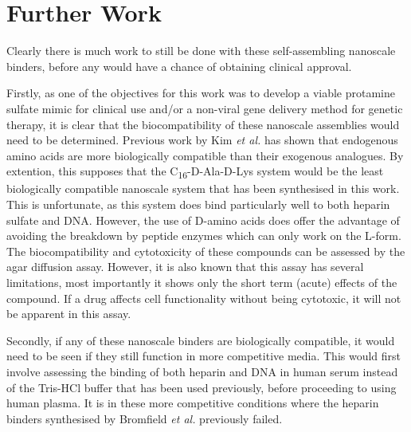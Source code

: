 
\chapter{Further Work} %
\label{Chapter4} %
Clearly there is much work to still be done with these self-assembling nanoscale binders, before any would have a chance of obtaining clinical approval.  

Firstly, as one of the objectives for this work was to develop a viable protamine sulfate mimic for clinical use and/or a non-viral gene delivery method for genetic therapy,  it is clear that the biocompatibility of these nanoscale assemblies would need to be determined. Previous work by Kim \textit{et al.} has shown that endogenous amino acids are more biologically compatible than their exogenous analogues.\textsuperscript{\cite{Kim2016PolycationsApplications}} By extention, this supposes that the C\textsubscript{16}-D-Ala-D-Lys system would be the least biologically compatible nanoscale system that has been synthesised in this work. This is unfortunate, as this system does bind particularly well to both heparin sulfate and DNA. However, the use of D-amino acids does offer the advantage of avoiding the breakdown by peptide enzymes which can only work on the L-form. 
\newline
The biocompatibility and cytotoxicity of these compounds can be assessed by the agar diffusion assay.\textsuperscript{\cite{InternationalStandardsOrganisation-ISO10993-5:2009Https://www.iso.org/standard/36406.html}} However, it is also known that this assay has several limitations, most importantly it shows only the short term (acute) effects of the compound. If a drug affects cell functionality without being cytotoxic, it will not be apparent in this assay.\textsuperscript{\cite{Pusnik2016TheCompounds}}

Secondly, if any of these nanoscale binders are biologically compatible, it would need to be seen if they still function in more competitive media. This would first involve assessing the binding of both heparin and DNA in human serum instead of the Tris-HCl buffer that has been used previously, before proceeding to using human plasma. It is in these more competitive conditions where the heparin binders synthesised by Bromfield \textit{et al.} previously failed.\textsuperscript{\cite{Bromfield2014NanoscaleMedia}}

